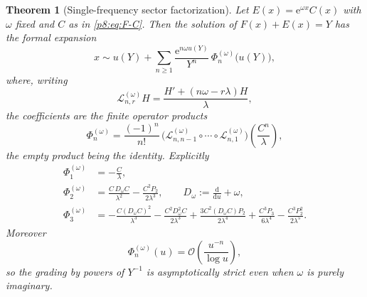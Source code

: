 \documentclass[11pt,a4paper,oneside]{book}
\theoremstyle{plain}
\newtheorem{theorem}{Theorem}[chapter]
\theoremstyle{definition}
\theoremstyle{remark}
\newcommand{\e}{\mathrm{e}}
\newcommand{\dd}{\mathrm{d}}
\newcommand{\bigO}{\mathcal{O}}
\begin{document}
\begin{theorem}[Single-frequency sector factorization]
\label{p8:thm:sector-factorization}
Let $E(x)=\e^{\omega x}C(x)$ with $\omega$ fixed and $C$ as in
\eqref{p8:eq:F-C}.  Then the solution of $F(x)+E(x)=Y$ has the formal
expansion
\begin{equation}\label{p8:eq:sector-transseries}
 x\sim u(Y)+\sum_{n\ge1}\frac{\e^{n\omega u(Y)}}{Y^{n}}\,
 \Phi_n^{(\omega)}\bigl(u(Y)\bigr),
\end{equation}
where, writing
\begin{equation}\label{p8:eq:L-operator}
 \mathcal{L}^{(\omega)}_{n,r}H=\frac{H'+(n\omega-r\lambda)H}{\lambda},
\end{equation}
the coefficients are the finite operator products
\begin{equation}\label{p8:eq:Phi-product}
 \Phi_n^{(\omega)}
 =\frac{(-1)^{n}}{n!}\,
 \bigl(\mathcal{L}^{(\omega)}_{n,n-1}\circ\cdots\circ
 \mathcal{L}^{(\omega)}_{n,1}\bigr)\!
 \left(\frac{C^{n}}{\lambda}\right),
\end{equation}
the empty product being the identity.  Explicitly
\begin{align}
 \Phi_1^{(\omega)}&=-\frac C\lambda,
 \label{p8:eq:Phi1}\\
 \Phi_2^{(\omega)}&=\frac{C\,D_\omega C}{\lambda^{2}}
 -\frac{C^{2}P_2}{2\lambda^{3}},
 \qquad D_\omega:=\frac{\dd}{\dd u}+\omega,
 \label{p8:eq:Phi2}\\
 \Phi_3^{(\omega)}&=-\frac{C(D_\omega C)^{2}}{\lambda^{3}}
 -\frac{C^{2}D_\omega^{2}C}{2\lambda^{3}}
 +\frac{3C^{2}(D_\omega C)P_2}{2\lambda^{4}}
 +\frac{C^{3}P_3}{6\lambda^{4}}
 -\frac{C^{3}P_2^{2}}{2\lambda^{5}} .
 \label{p8:eq:Phi3}
\end{align}
Moreover
\begin{equation}\label{p8:eq:Phi-size}
 \Phi_n^{(\omega)}(u)=\bigO\!\left(\frac{u^{-n}}{\log u}\right),
\end{equation}
so the grading by powers of $Y^{-1}$ is asymptotically strict even when
$\omega$ is purely imaginary.
\end{theorem}
\end{document}
